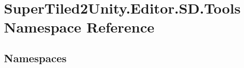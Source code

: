 \hypertarget{namespace_super_tiled2_unity_1_1_editor_1_1_s_d_1_1_tools}{}\section{Super\+Tiled2\+Unity.\+Editor.\+S\+D.\+Tools Namespace Reference}
\label{namespace_super_tiled2_unity_1_1_editor_1_1_s_d_1_1_tools}
\subsection*{Namespaces}
\begin{DoxyCompactItemize}
\end{DoxyCompactItemize}
